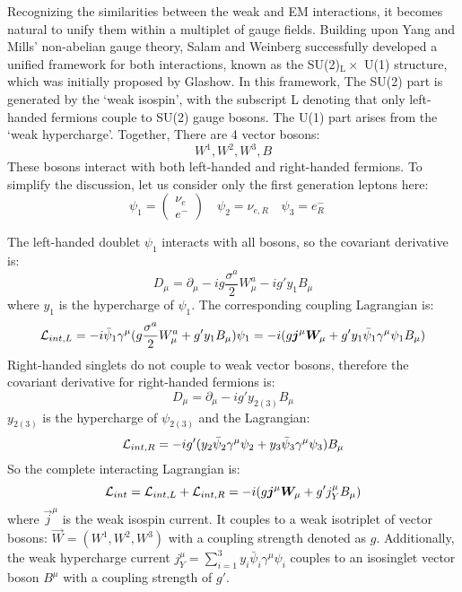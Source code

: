 Recognizing the similarities between the weak and EM interactions, it becomes natural
to unify them within a multiplet of gauge fields. Building upon Yang and Mills' non-abelian 
gauge theory, Salam and Weinberg successfully developed a unified framework 
for both interactions, known as the SU(2)${}_\mathrm{L} \times$ U(1) structure, 
which was initially proposed by Glashow. In this framework, The SU(2) part is 
generated by the `weak isospin', with the subscript L denoting that
only left-handed fermions couple to SU(2) gauge bosons. The U(1)
part arises from the `weak hypercharge'. Together, There are 4 vector bosons:
$$ W^1, W^2, W^3, B $$
These bosons interact with both left-handed and right-handed fermions. 
To simplify the discussion, let us consider only the first generation leptons here:
\begin{equation}
    \psi_1 = \begin{pmatrix} \nu_e \\ e^-  \end{pmatrix}	\quad
    \psi_2 = \nu_{e,R}	\quad
    \psi_3 = e^-_R    \quad
\end{equation}

The left-handed doublet $\psi_1$ interacts with all bosons, 
so the covariant derivative is:
\begin{equation}
    D_\mu = \partial_\mu - ig\frac{\sigma^a}{2}W_\mu^a - ig'y_1B_\mu
\end{equation}
where $y_1$ is the hypercharge of $\psi_1$.
The corresponding coupling Lagrangian is:
\begin{equation}
    \mathcal{L}_{int, L} = -i\bar{\psi}_1 \gamma^\mu (g\frac{\sigma^a}{2}W^a_\mu + g'y_1B_\mu) \psi_1
	= -i(g\boldsymbol{j}^\mu\boldsymbol{W}_\mu + g'y_1\bar{\psi}_1\gamma^\mu\psi_1 B_\mu)
\end{equation}
Right-handed singlets do not couple to weak vector bosons, 
therefore the covariant derivative for right-handed fermions is:
\begin{equation}
    D_\mu = \partial_\mu - ig'y_{2(3)}B_\mu
\end{equation}
$y_{2(3)}$ is the hypercharge of $\psi_{2(3)}$
and the Lagrangian:
\begin{equation}
    \mathcal{L}_{int, R} = -ig'(y_2\bar{\psi}_2 \gamma^\mu \psi_2 + y_3\bar{\psi}_3\gamma^\mu \psi_3) B_\mu
\end{equation}
So the complete interacting Lagrangian is:
\begin{equation}
    \mathcal{L}_{int} = \mathcal{L}_{int, L} + \mathcal{L}_{int, R} = -i(g\boldsymbol{j}^\mu \boldsymbol{W}_\mu + g'j^\mu_{Y} B_\mu)
    \label{eq:GSW}
\end{equation}
where $\vec{j}^\mu$ is the weak isospin current. It couples to a weak 
isotriplet of vector bosons: $\vec{W} = (W^1, W^2, W^3)$ with
a coupling strength denoted as $g$. Additionally, the weak hypercharge current 
$j^\mu_{Y} = \sum_{i=1}^3 y_i\bar{\psi}_i\gamma^\mu\psi_i$ couples to 
an isosinglet vector boson $B^\mu$ with a coupling strength of $g'$. 

